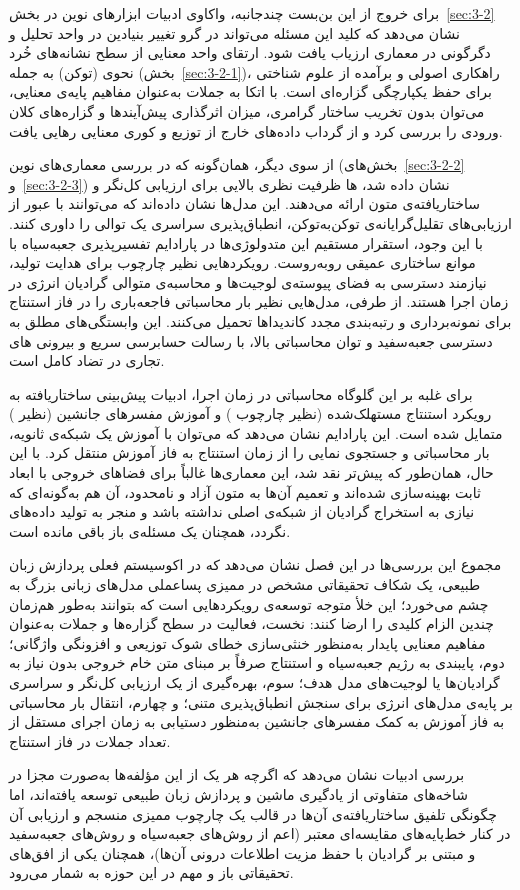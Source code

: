 برای خروج از این بن‌بست چندجانبه، واکاوی ادبیات ابزارهای نوین در بخش~\ref{sec:3-2} نشان می‌دهد که کلید این مسئله می‌تواند در گرو تغییر بنیادین در واحد تحلیل و دگرگونی در معماری ارزیاب یافت شود. ارتقای واحد معنایی از سطح نشانه‌های خُرد نحوی (توکن) به جمله (بخش~\ref{sec:3-2-1})، راهکاری اصولی و برآمده از علوم شناختی برای حفظ یکپارچگی گزاره‌ای است. با اتکا به جملات به‌عنوان مفاهیم پایه‌ی معنایی، می‌توان بدون تخریب ساختار گرامری، میزان اثرگذاری پیش‌آیندها و گزاره‌های کلان ورودی را بررسی کرد و از گرداب داده‌های خارج از توزیع و کوری معنایی رهایی یافت.

از سوی دیگر، همان‌گونه که در بررسی معماری‌های نوین (بخش‌های~\ref{sec:3-2-2} و~\ref{sec:3-2-3}) نشان داده شد، ها ظرفیت نظری بالایی برای ارزیابی کل‌نگر و ساختاریافته‌ی متون ارائه می‌دهند. این مدل‌ها نشان داده‌اند که می‌توانند با عبور از ارزیابی‌های تقلیل‌گرایانه‌ی توکن‌به‌توکن، انطباق‌پذیری سراسری یک توالی را داوری کنند. با این وجود، استقرار مستقیم این متدولوژی‌ها در پارادایم تفسیرپذیری جعبه‌سیاه با موانع ساختاری عمیقی روبه‌روست. رویکردهایی نظیر چارچوب  برای هدایت تولید، نیازمند دسترسی به فضای پیوسته‌ی لوجیت‌ها و محاسبه‌ی متوالی گرادیان انرژی در زمان اجرا هستند. از طرفی، مدل‌هایی نظیر  بار محاسباتی فاجعه‌باری را در فاز استنتاج برای نمونه‌برداری و رتبه‌بندی مجدد کاندیداها تحمیل می‌کنند. این وابستگی‌های مطلق به دسترسی جعبه‌سفید و توان محاسباتی بالا، با رسالت حسابرسی سریع و بیرونی های تجاری در تضاد کامل است.

برای غلبه بر این گلوگاه محاسباتی در زمان اجرا، ادبیات پیش‌بینی ساختاریافته به رویکرد استنتاج مستهلک‌شده (نظیر چارچوب ) و آموزش مفسرهای جانشین (نظیر ) متمایل شده است. این پارادایم نشان می‌دهد که می‌توان با آموزش یک شبکه‌ی ثانویه، بار محاسباتی و جستجوی نمایی را از زمان استنتاج به فاز آموزش منتقل کرد. با این حال، همان‌طور که پیش‌تر نقد شد، این معماری‌ها غالباً برای فضاهای خروجی با ابعاد ثابت بهینه‌سازی شده‌اند و تعمیم آن‌ها به متون آزاد و نامحدود، آن هم به‌گونه‌ای که نیازی به استخراج گرادیان از شبکه‌ی اصلی نداشته باشد و منجر به تولید داده‌های  نگردد، همچنان یک مسئله‌ی باز باقی مانده است.

مجموع این بررسی‌ها در این فصل نشان می‌دهد که در اکوسیستم فعلی پردازش زبان طبیعی، یک شکاف تحقیقاتی مشخص در ممیزی پساعملی مدل‌های زبانی بزرگ به چشم می‌خورد؛ این خلأ متوجه توسعه‌ی رویکردهایی است که بتوانند به‌طور هم‌زمان چندین الزام کلیدی را ارضا کنند: نخست، فعالیت در سطح گزاره‌ها و جملات به‌عنوان مفاهیم معنایی پایدار به‌منظور خنثی‌سازی خطای شوک توزیعی و افزونگی واژگانی؛ دوم، پایبندی به رژیم جعبه‌سیاه و استنتاج صرفاً بر مبنای متن خام خروجی بدون نیاز به گرادیان‌ها یا لوجیت‌های مدل هدف؛ سوم، بهره‌گیری از یک ارزیابی کل‌نگر و سراسری بر پایه‌ی مدل‌های انرژی برای سنجش انطباق‌پذیری متنی؛ و چهارم، انتقال بار محاسباتی به فاز آموزش به کمک مفسرهای جانشین به‌منظور دستیابی به زمان اجرای مستقل از تعداد جملات در فاز استنتاج.

بررسی ادبیات نشان می‌دهد که اگرچه هر یک از این مؤلفه‌ها به‌صورت مجزا در شاخه‌های متفاوتی از یادگیری ماشین و پردازش زبان طبیعی توسعه یافته‌اند، اما چگونگی تلفیق ساختاریافته‌ی آن‌ها در قالب یک چارچوب ممیزی منسجم و ارزیابی آن در کنار خط‌پایه‌های مقایسه‌ای معتبر (اعم از روش‌های جعبه‌سیاه و روش‌های جعبه‌سفید و مبتنی بر گرادیان با حفظ مزیت اطلاعات درونی آن‌ها)، همچنان یکی از افق‌های تحقیقاتی باز و مهم در این حوزه به شمار می‌رود.